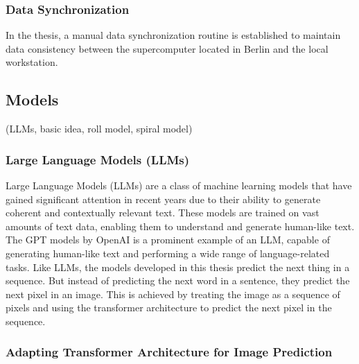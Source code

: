 
    \subsubsection{Data Synchronization}

    In the thesis, a manual data synchronization routine is established to maintain data consistency between the supercomputer located in Berlin and the local workstation.

\subsection{Models}
    (LLMs, basic idea, roll model, spiral model)

    \subsubsection{Large Language Models (LLMs)}

    Large Language Models (LLMs) are a class of machine learning models that have gained significant attention in recent years due to their ability to generate coherent and contextually relevant text. These models are trained on vast amounts of text data, enabling them to understand and generate human-like text. The GPT models by OpenAI \autocite{GPT2radford2019} is a prominent example of an LLM, capable of generating human-like text and performing a wide range of language-related tasks. Like LLMs, the models developed in this thesis predict the next thing in a sequence. But instead of predicting the next word in a sentence, they predict the next pixel in an image. This is achieved by treating the image as a sequence of pixels and using the transformer architecture to predict the next pixel in the sequence.

    \subsubsection{Adapting Transformer Architecture for Image Prediction}

